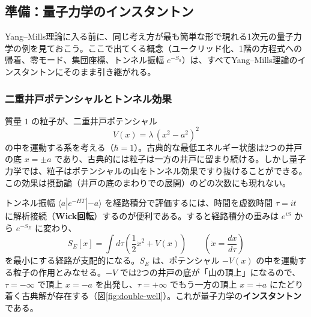 \documentclass[uplatex, dvipdfmx, book]{jsbook}
\let\origsubsection\subsection
\let\origsubsubsection\subsubsection
\renewcommand{\section}{\origsubsection}
\renewcommand{\subsection}{\origsubsubsection}
\renewcommand{\subsubsection}{\paragraph}
\begin{document}
\section{準備：量子力学のインスタントン}
\label{sec:qm-instanton}

Yang--Mills理論に入る前に、同じ考え方が最も簡単な形で現れる1次元の量子力学の例を見ておこう。ここで出てくる概念（ユークリッド化、1階の方程式への帰着、零モード、集団座標、トンネル振幅 $e^{-S_0}$）は、すべてYang--Mills理論のインスタントンにそのまま引き継がれる。

\subsection{二重井戸ポテンシャルとトンネル効果}

質量 $1$ の粒子が、二重井戸ポテンシャル
\begin{equation}
    V(x) = \lambda\,(x^2 - a^2)^2
\end{equation}
の中を運動する系を考える（$\hbar = 1$）。古典的な最低エネルギー状態は2つの井戸の底 $x = \pm a$ であり、古典的には粒子は一方の井戸に留まり続ける。しかし量子力学では、粒子はポテンシャルの山をトンネル効果ですり抜けることができる。この効果は摂動論（井戸の底のまわりでの展開）のどの次数にも現れない。

トンネル振幅 $\langle a | e^{-HT} | {-a} \rangle$ を経路積分で評価するには、時間を虚数時間 $\tau = it$ に解析接続（\textbf{Wick回転}）するのが便利である。すると経路積分の重みは $e^{iS}$ から $e^{-S_E}$ に変わり、
\begin{equation}
    S_E[x] = \int d\tau \left( \frac{1}{2}\dot{x}^2 + V(x) \right) \qquad \left( \dot{x} = \frac{dx}{d\tau} \right)
\end{equation}
を最小にする経路が支配的になる。$S_E$ は、ポテンシャル $-V(x)$ の中を運動する粒子の作用とみなせる。$-V$ では2つの井戸の底が「山の頂上」になるので、$\tau = -\infty$ で頂上 $x = -a$ を出発し、$\tau = +\infty$ でもう一方の頂上 $x = +a$ にたどり着く古典解が存在する（図\ref{fig:double-well}）。これが量子力学の\textbf{インスタントン}である。
\end{document}
